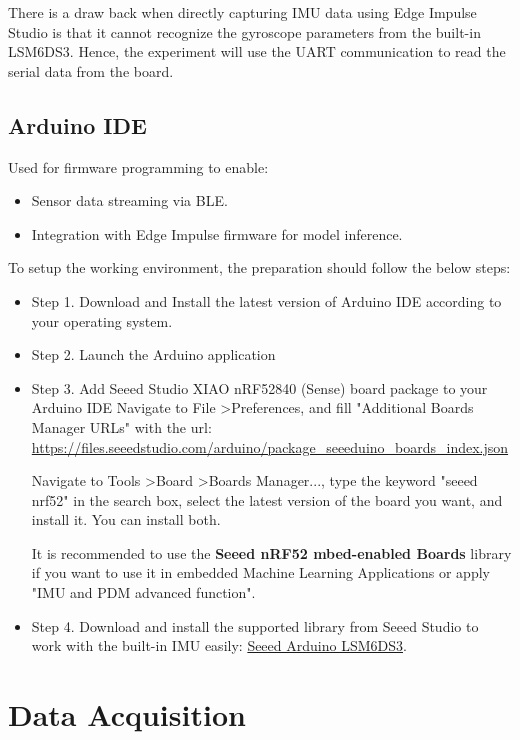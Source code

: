     There is a draw back when directly capturing IMU data using Edge Impulse Studio is that it cannot recognize the gyroscope parameters from the built-in LSM6DS3. Hence, the experiment will use the UART communication to read the serial data from the board.

    

\subsection{Arduino IDE}
Used for firmware programming to enable:

\begin{itemize}
    \item Sensor data streaming via BLE.
    \item Integration with Edge Impulse firmware for model inference.
\end{itemize}

To setup the working environment, the preparation should follow the below steps:

\begin{itemize}
    \item Step 1. Download and Install the latest version of Arduino IDE according to your operating system.
    \item Step 2. Launch the Arduino application
    \item Step 3. Add Seeed Studio XIAO nRF52840 (Sense) board package to your Arduino IDE
        Navigate to File \textgreater Preferences, and fill "Additional Boards Manager URLs" with the url: \url{https://files.seeedstudio.com/arduino/package_seeeduino_boards_index.json}
        
        Navigate to Tools \textgreater Board \textgreater Boards Manager..., type the keyword "seeed nrf52" in the search box, select the latest version of the board you want, and install it. You can install both.
        
        It is recommended to use the \textbf{Seeed nRF52 mbed-enabled Boards} library if you want to use it in embedded Machine Learning Applications or apply "IMU and PDM advanced function".
    \item Step 4. Download and install the supported library from Seeed Studio to work with the built-in IMU easily: \href{https://github.com/Seeed-Studio/Seeed_Arduino_LSM6DS3}{Seeed Arduino LSM6DS3}.
\end{itemize}

\section{Data Acquisition}
